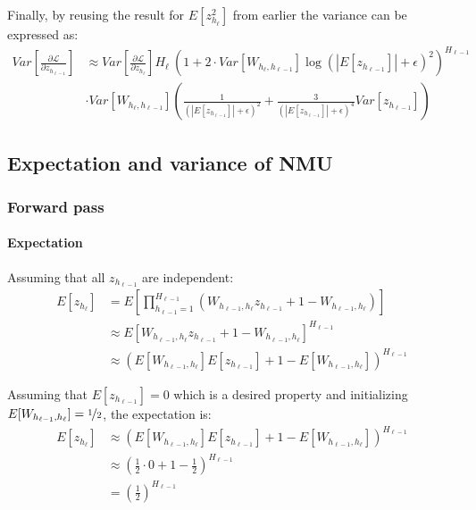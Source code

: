 Finally, by reusing the result for $E[z_{h_\ell}^2]$ from earlier the variance can be expressed as:
\begin{equation}
\begin{aligned}
Var\left[\frac{\partial \mathcal{L}}{\partial z_{h_{\ell-1}}}\right] &\approx Var\left[\frac{\partial \mathcal{L}}{\partial z_{h_{\ell}}}\right] H_{\ell}\ \left(1 + 2 \cdot Var[W_{h_{\ell}, h_{\ell-1}}] \log(|E[z_{h_{\ell-1}}]| + \epsilon)^2\right)^{H_{\ell-1}} \\
&\cdot Var[W_{h_{\ell}, h_{\ell-1}}] \left(\frac{1}{\left(|E[z_{h_{\ell-1}}]| + \epsilon\right)^2} + \frac{3}{\left(|E[z_{h_{\ell-1}}]| + \epsilon\right)^4} Var[z_{h_{\ell-1}}]\right)
\end{aligned}
\end{equation}

\subsection{Expectation and variance of NMU}
\label{sec:appendix:moments:nmu}
\subsubsection{Forward pass}
\paragraph{Expectation} Assuming that all $z_{h_{\ell-1}}$ are independent:
\begin{equation}
\begin{aligned}
E[z_{h_\ell}] &= E\left[\prod_{h_{\ell-1}=1}^{H_{\ell-1}} \left(W_{h_{\ell-1},h_\ell} z_{h_{\ell-1}} + 1 - W_{h_{\ell-1},h_\ell} \right)\right] \\
&\approx E\left[W_{h_{\ell-1},h_\ell} z_{h_{\ell-1}} + 1 - W_{h_{\ell-1},h_\ell} \right]^{H_{\ell-1}} \\
&\approx \left(E[W_{h_{\ell-1},h_\ell}] E[z_{h_{\ell-1}}] + 1 - E[W_{h_{\ell-1},h_\ell}] \right)^{H_{\ell-1}}
\end{aligned}
\end{equation}

Assuming that $E[z_{h_{\ell-1}}] = 0$ which is a desired property and initializing $E[W_{h_{\ell-1},h_\ell}] = \nicefrac{1}{2}$, the expectation is:
\begin{equation}
\begin{aligned}
E[z_{h_\ell}] &\approx \left(E[W_{h_{\ell-1},h_\ell}] E[z_{h_{\ell-1}}] + 1 - E[W_{h_{\ell-1},h_\ell}] \right)^{H_{\ell-1}} \\
&\approx\left(\frac{1}{2}\cdot0 + 1 - \frac{1}{2}\right)^{H_{\ell-1}} \\
&=\left(\frac{1}{2}\right)^{H_{\ell-1}}
\end{aligned}
\end{equation}

